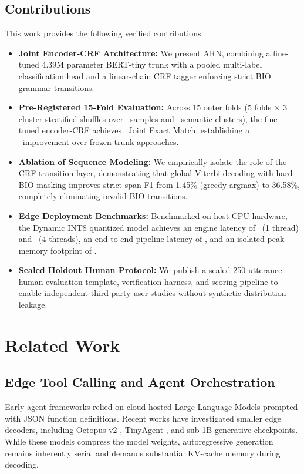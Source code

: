 \documentclass[letterpaper]{article}
\begin{document}
\subsection{Contributions}

This work provides the following verified contributions:
\begin{itemize}
    \item \textbf{Joint Encoder-CRF Architecture:} We present ARN, combining a fine-tuned 4.39M parameter BERT-tiny trunk with a pooled multi-label classification head and a linear-chain CRF tagger enforcing strict BIO grammar transitions.
    \item \textbf{Pre-Registered 15-Fold Evaluation:} Across 15 outer folds (5 folds $\times$ 3 cluster-stratified shuffles over \TotalDatasetSamples\ samples and \TotalClusters\ semantic clusters), the fine-tuned encoder-CRF achieves \PrimaryJointEM\ Joint Exact Match, establishing a \FineTuningJointEMDelta\ improvement over frozen-trunk approaches.
    \item \textbf{Ablation of Sequence Modeling:} We empirically isolate the role of the CRF transition layer, demonstrating that global Viterbi decoding with hard BIO masking improves strict span F1 from 1.45\% (greedy argmax) to 36.58\%, completely eliminating invalid BIO transitions.
    \item \textbf{Edge Deployment Benchmarks:} Benchmarked on host CPU hardware, the Dynamic INT8 quantized model achieves an engine latency of \ONNXINTOnetTLatencyMean\ (1 thread) and \ONNXINTFourTLatencyMean\ (4 threads), an end-to-end pipeline latency of \PipelineFourTLatencyMean, and an isolated peak memory footprint of \IsolatedPeakRSS.
    \item \textbf{Sealed Holdout Human Protocol:} We publish a sealed 250-utterance human evaluation template, verification harness, and scoring pipeline to enable independent third-party user studies without synthetic distribution leakage.
\end{itemize}

\section{Related Work}

\subsection{Edge Tool Calling and Agent Orchestration}
Early agent frameworks relied on cloud-hosted Large Language Models prompted with JSON function definitions. Recent works have investigated smaller edge decoders, including Octopus v2 \citep{chen2024octopus}, TinyAgent \citep{erdogan2024tinyagent}, and sub-1B generative checkpoints. While these models compress the model weights, autoregressive generation remains inherently serial and demands substantial KV-cache memory during decoding.
\end{document}
